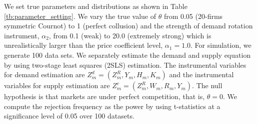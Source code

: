 \documentclass[11pt, a4paper]{article}
\begin{document}
We set true parameters and distributions as shown in Table \ref{tb:parameter_setting}. 
We vary the true value of $\theta$ from 0.05 (20-firms symmetric Cournot) to 1 (perfect collusion) and the strength of demand rotation instrument, $\alpha_2$, from 0.1 (weak) to 20.0 (extremely strong) which is unrealistically larger than the price coefficient level, $\alpha_1=1.0$.
For simulation, we generate 100 data sets.
We separately estimate the demand and supply equation by using two-stage least squares (2SLS) estimation.
The instrumental variables for demand estimation are $Z^{d}_{m} = (Z^{R}_{m}, Y_m, H_{m}, K_{m})$ and the instrumental variables for supply estimation are $Z^{c}_{m} = (Z^{R}_{m}, W_{m}, R_{m}, Y_m)$. 
The null hypothesis is that markets are under perfect competition, that is, $\theta=0$.
We compute the rejection
frequency as the power by using t-statistics at a significance level of 0.05 over 100 datasets.
\end{document}
